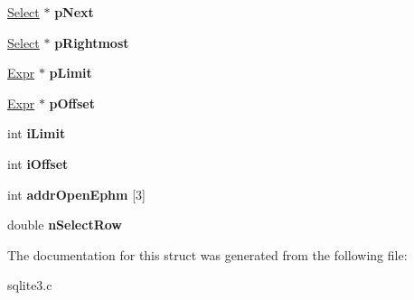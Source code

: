 \begin{DoxyCompactItemize}
\item 
\hypertarget{struct_select_a96aa0caf60390b8f5e88589639205c40}{\hyperlink{struct_select}{Select} $\ast$ {\bfseries p\-Next}}\label{struct_select_a96aa0caf60390b8f5e88589639205c40}

\item 
\hypertarget{struct_select_a6ee045fa4305f1d68be5bdc22555e624}{\hyperlink{struct_select}{Select} $\ast$ {\bfseries p\-Rightmost}}\label{struct_select_a6ee045fa4305f1d68be5bdc22555e624}

\item 
\hypertarget{struct_select_a11d3b48d04d58be818cdefb10aa061a0}{\hyperlink{struct_expr}{Expr} $\ast$ {\bfseries p\-Limit}}\label{struct_select_a11d3b48d04d58be818cdefb10aa061a0}

\item 
\hypertarget{struct_select_aeaf016a10203b911000354122562fb46}{\hyperlink{struct_expr}{Expr} $\ast$ {\bfseries p\-Offset}}\label{struct_select_aeaf016a10203b911000354122562fb46}

\item 
\hypertarget{struct_select_abf68908bf029af42a32c60a2558a8b1e}{int {\bfseries i\-Limit}}\label{struct_select_abf68908bf029af42a32c60a2558a8b1e}

\item 
\hypertarget{struct_select_ac12bebd00ed988df3ad1efb8e6c63fe4}{int {\bfseries i\-Offset}}\label{struct_select_ac12bebd00ed988df3ad1efb8e6c63fe4}

\item 
\hypertarget{struct_select_a5cad3b59bf1803be552d002e74bdfd47}{int {\bfseries addr\-Open\-Ephm} \mbox{[}3\mbox{]}}\label{struct_select_a5cad3b59bf1803be552d002e74bdfd47}

\item 
\hypertarget{struct_select_a177125317478139f9ce834e4f7a93c52}{double {\bfseries n\-Select\-Row}}\label{struct_select_a177125317478139f9ce834e4f7a93c52}

\end{DoxyCompactItemize}


The documentation for this struct was generated from the following file\-:\begin{DoxyCompactItemize}
\item 
sqlite3.\-c\end{DoxyCompactItemize}
